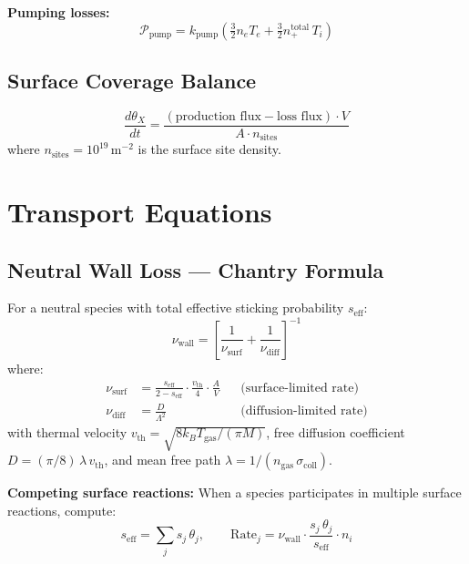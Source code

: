 \documentclass[11pt,a4paper]{article}
\begin{document}
\textbf{Pumping losses:}
\begin{equation}
  \mathcal{P}_\text{pump} = k_\text{pump}\left(\tfrac{3}{2}n_e T_e + \tfrac{3}{2}n_+^\text{total}\,T_i\right)
\end{equation}

\subsection{Surface Coverage Balance}

\begin{equation}
  \frac{d\theta_X}{dt} = \frac{(\text{production flux} - \text{loss flux})\cdot V}{A \cdot n_\text{sites}}
\end{equation}
where $n_\text{sites} = 10^{19}$\,m$^{-2}$ is the surface site density.

\section{Transport Equations}

\subsection{Neutral Wall Loss --- Chantry Formula}

For a neutral species with total effective sticking probability $s_\text{eff}$:
\begin{equation}\label{eq:chantry}
  \boxed{\nu_\text{wall} = \left[\frac{1}{\nu_\text{surf}} + \frac{1}{\nu_\text{diff}}\right]^{-1}}
\end{equation}
where:
\begin{align}
  \nu_\text{surf} &= \frac{s_\text{eff}}{2 - s_\text{eff}}\cdot\frac{v_\text{th}}{4}\cdot\frac{A}{V} & &\text{(surface-limited rate)} \\
  \nu_\text{diff} &= \frac{D}{\Lambda^2} & &\text{(diffusion-limited rate)}
\end{align}
with thermal velocity $v_\text{th} = \sqrt{8k_BT_\text{gas}/(\pi M)}$, free diffusion coefficient $D = (\pi/8)\,\lambda\,v_\text{th}$, and mean free path $\lambda = 1/(n_\text{gas}\,\sigma_\text{coll})$.

\textbf{Competing surface reactions:} When a species participates in multiple surface reactions, compute:
\begin{equation}
  s_\text{eff} = \sum_j s_j\,\theta_j, \qquad \text{Rate}_j = \nu_\text{wall}\cdot\frac{s_j\,\theta_j}{s_\text{eff}}\cdot n_i
\end{equation}
\end{document}

